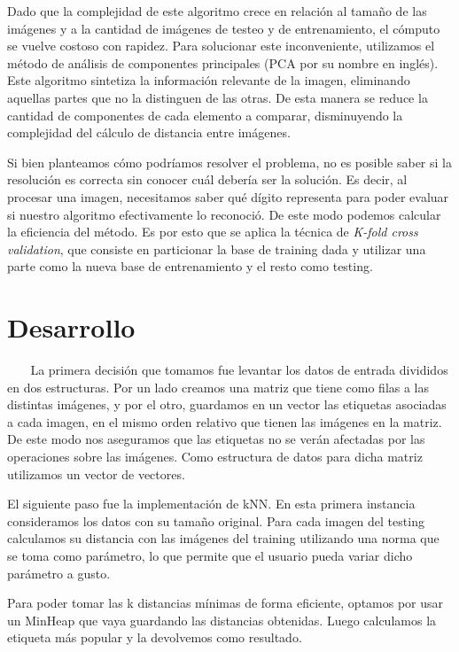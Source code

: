 \documentclass{article}
\begin{document}
Dado que la complejidad de este algoritmo crece en relación al tamaño de las imágenes y a la cantidad de imágenes de testeo y de entrenamiento, el cómputo se vuelve costoso con rapidez. Para solucionar este inconveniente, utilizamos el método de análisis de componentes principales (PCA por su nombre en inglés). Este algoritmo sintetiza la información relevante de la imagen, eliminando aquellas partes que no la distinguen de las otras. De esta manera se reduce la cantidad de componentes de cada elemento a comparar, disminuyendo la complejidad del cálculo de distancia entre imágenes.


Si bien planteamos cómo podríamos resolver el problema, no es posible saber si la resolución es correcta sin conocer cuál debería ser la solución. Es decir, al procesar una imagen, necesitamos saber qué dígito representa para poder evaluar si nuestro algoritmo efectivamente lo reconoció. De este modo podemos calcular la eficiencia del método. Es por esto que se aplica la técnica de \textit{K-fold cross validation}, que consiste en particionar la base de training dada y utilizar una parte como la nueva base de entrenamiento y el resto como testing.



\pagebreak



\section*{Desarrollo}{}

$\ $ $\ $ $\ $ $\ $La primera decisión que tomamos fue levantar los datos de entrada  divididos en dos estructuras. Por un lado creamos una matriz que tiene como filas a las distintas imágenes, y por el otro, guardamos en un vector las etiquetas asociadas a cada imagen, en el mismo orden relativo que tienen las imágenes en la matriz. De este modo nos aseguramos que las etiquetas no se verán afectadas por las operaciones sobre las imágenes. Como estructura de datos para dicha matriz utilizamos un vector de vectores.

El siguiente paso fue la implementación de kNN. En esta primera instancia consideramos los datos con su tamaño original. Para cada imagen del testing calculamos su distancia con las imágenes del training utilizando una norma que se toma como parámetro, lo que permite que el usuario pueda variar dicho parámetro a gusto. 

Para poder tomar las k distancias mínimas de forma eficiente, optamos por usar un MinHeap que vaya guardando las distancias obtenidas. Luego calculamos la etiqueta más popular y la devolvemos como resultado.
\end{document}

